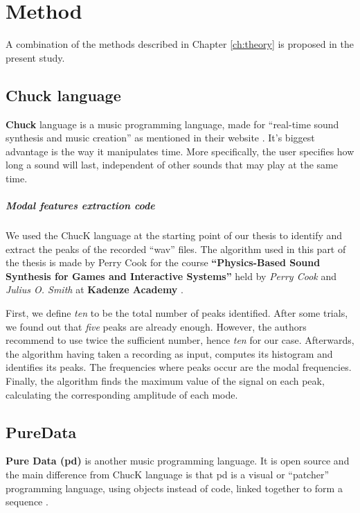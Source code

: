 \chapter{Method}\label{ch:method}

A combination of the methods described in Chapter \ref{ch:theory} is proposed in the present study.


\section{Chuck language}
\textbf{Chuck} language is a music programming language, made for ``real-time sound synthesis and music creation'' as mentioned in their website \cite{bib:chuck}. It's biggest advantage is the way it manipulates time. More specifically, the user specifies how long a sound will last, independent of other sounds that may play at the same time.

\paragraph{Modal features extraction code\\}
We used the ChucK language at the starting point of our thesis to identify and extract the peaks of the recorded ``wav'' files. The algorithm used in this part of the thesis is made by Perry Cook for the course \textbf{``Physics-Based Sound Synthesis for Games and Interactive Systems''} held by \textit{Perry Cook} and \textit{Julius O. Smith} at \textbf{Kadenze Academy} \cite{bib:physicsbasedcourse}.

First, we define \textit{ten} to be the total number of peaks identified. After some trials, we found out that \textit{five} peaks are already enough. However, the authors recommend to use twice the sufficient number, hence \textit{ten} for our case. Afterwards, the algorithm having taken a recording as input, computes its histogram and identifies its peaks. The frequencies where peaks occur are the modal frequencies. Finally, the algorithm finds the maximum value of the signal on each peak, calculating the corresponding amplitude of each mode.

\section{PureData}
\textbf{Pure Data (pd)} is another music programming language. It is open source and the main difference from ChucK language is that pd is a visual or ``patcher'' programming language, using objects instead of code, linked together to form a sequence \cite{bib:pd}.

